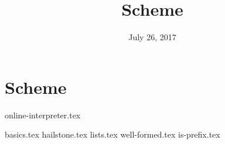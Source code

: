 \documentclass{exam}
\title{Scheme}
\date{July 26, 2017}
\begin{document}
\maketitle

\section{Scheme}
{online-interpreter.tex}
\begin{questions}
{basics.tex}
{hailstone.tex}
\clearpage
{lists.tex}
{well-formed.tex}
{is-prefix.tex}
\end{questions}
\end{document}
